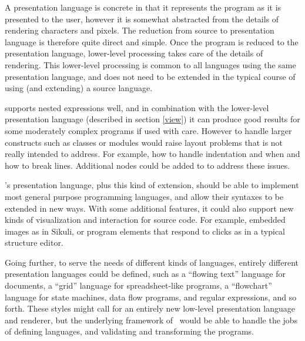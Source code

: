 A presentation language is concrete in that it represents the program as it is presented to the user, however it is somewhat abstracted from the details of rendering characters and pixels. The reduction from source to presentation language is therefore quite direct and simple. Once the program is reduced to the presentation language, lower-level processing takes care of the details of rendering. This lower-level processing is common to all languages using the same presentation language, and does not need to be extended in the typical course of using (and extending) a source language.

 supports nested expressions well, and in combination with the lower-level presentation language (described in section \ref{view}) it can produce good results for some moderately complex programs if used with care. However to handle larger constructs such as classes or modules would raise layout problems that  is not really intended to address. For example, how to handle indentation and when and how to break lines. Additional nodes could be added to  to address these issues.

\Meta's presentation language, plus this kind of extension, should be able to implement most general purpose programming languages, and allow their syntaxes to be extended in new ways. With some additional features, it could also support new kinds of visualization and interaction for source code. For example, embedded images as in Sikuli\cite{sikuli}, or program elements that respond to clicks as in a typical structure editor.

Going further, to serve the needs of different kinds of languages, entirely different presentation languages could be defined, such as a ``flowing text'' language for documents, a ``grid'' language for spreadsheet-like programs, a ``flowchart'' language for state machines, data flow programs, and regular expressions, and so forth. These styles might call for an entirely new low-level presentation language and renderer, but the underlying framework of \Meta\ would be able to handle the jobs of defining languages, and validating and transforming the programs.

%
%

